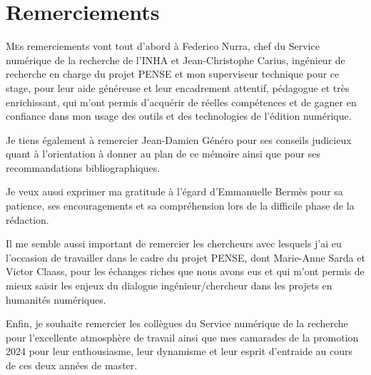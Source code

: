 \chapter{Remerciements}
	
\lettrine{M}es remerciements vont tout d’abord à Federico Nurra, chef du Service numérique de la recherche de l’INHA et Jean-Christophe Carius, ingénieur de recherche en charge du projet PENSE et mon superviseur technique pour ce stage, pour leur aide généreuse et leur encadrement attentif, pédagogue et très enrichissant, qui m’ont permis d’acquérir de réelles compétences et de gagner en confiance dans mon usage des outils et des technologies de l’édition numérique.

Je tiens également à remercier Jean-Damien Généro pour ses conseils judicieux quant à l’orientation à donner au plan de ce mémoire ainsi que pour ses recommandations bibliographiques.

Je veux aussi exprimer ma gratitude à l’égard d’Emmanuelle Bermès pour sa patience, ses encouragements et sa compréhension lors de la difficile phase de la rédaction.

Il me semble aussi important de remercier les chercheurs avec lesquels j’ai eu l’occasion de travailler dans le cadre du projet PENSE, dont Marie-Anne Sarda et Victor Claass, pour les échanges riches que nous avons eus et qui m’ont permis de mieux saisir les enjeux du dialogue ingénieur/chercheur dans les projets en humanités numériques.

Enfin, je souhaite remercier les collègues du Service numérique de la recherche pour l’excellente atmosphère de travail ainsi que mes camarades de la promotion 2024 pour leur enthousiasme, leur dynamisme et leur esprit d’entraide au cours de ces deux années de master.

	\newpage{\pagestyle{empty}\cleardoublepage}